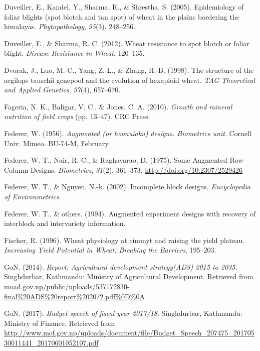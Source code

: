 \documentclass[12pt,oneside]{dukestatscithesis} %
\newlength{\cslhangindent}
\newenvironment{cslreferences}%
  {\setlength{\parindent}{0pt}%
  \everypar{\setlength{\hangindent}{\cslhangindent}}\ignorespaces}%
  {\par}
\begin{document}
\begin{cslreferences}
\leavevmode\hypertarget{ref-duveiller2005epidemiology}{}%
Duveiller, E., Kandel, Y., Sharma, R., \& Shrestha, S. (2005). Epidemiology of foliar blights (spot blotch and tan spot) of wheat in the plains bordering the himalayas. \emph{Phytopathology}, \emph{95}(3), 248--256.

\leavevmode\hypertarget{ref-duveiller2012wheat}{}%
Duveiller, E., \& Sharma, R. C. (2012). Wheat resistance to spot blotch or foliar blight. \emph{Disease Resistance in Wheat}, 120--135.

\leavevmode\hypertarget{ref-dvorak1998structure}{}%
Dvorak, J., Luo, M.-C., Yang, Z.-L., \& Zhang, H.-B. (1998). The structure of the aegilops tauschii genepool and the evolution of hexaploid wheat. \emph{TAG Theoretical and Applied Genetics}, \emph{97}(4), 657--670.

\leavevmode\hypertarget{ref-fageria2010growth}{}%
Fageria, N. K., Baligar, V. C., \& Jones, C. A. (2010). \emph{Growth and mineral nutrition of field crops} (pp. 13--47). CRC Press.

\leavevmode\hypertarget{ref-federer1956augmented}{}%
Federer, W. (1956). \emph{Augmented (or hoonuiaku) designs. Biometrics unit}. Cornell Univ. Mimeo. BU-74-M, February.

\leavevmode\hypertarget{ref-federer_augmented_1975}{}%
Federer, W. T., Nair, R. C., \& Raghavarao, D. (1975). Some Augmented Row-Column Designs. \emph{Biometrics}, \emph{31}(2), 361--373. \url{http://doi.org/10.2307/2529426}

\leavevmode\hypertarget{ref-federer_incomplete_2002}{}%
Federer, W. T., \& Nguyen, N.-k. (2002). Incomplete block designs. \emph{Encyclopedia of Environmetrics}.

\leavevmode\hypertarget{ref-federer_augmented_1994}{}%
Federer, W. T., \& others. (1994). Augmented experiment designs with recovery of interblock and intervariety information.

\leavevmode\hypertarget{ref-fischer1996wheat}{}%
Fischer, R. (1996). Wheat physiology at cimmyt and raising the yield plateau. \emph{Increasing Yield Potential in Wheat: Breaking the Barriers}, 195--203.

\leavevmode\hypertarget{ref-ads2072_report}{}%
GoN. (2014). \emph{Report: Agricultural development strategy(ADS) 2015 to 2035}. Singhdurbar, Kathmandu: Ministry of Agricultural Development. Retrieved from \url{moad.gov.np/public/uploads/537172830-final\%20ADS\%20report\%202072.pdf\%0D\%0A}

\leavevmode\hypertarget{ref-fiscal_budget201718}{}%
GoN. (2017). \emph{Budget speech of fiscal year 2017/18}. Singhdurbar, Kathmandu: Ministry of Finance. Retrieved from \url{http://www.mof.gov.np/uploads/document/file/Budget_Speech_207475_20170530011441_20170601052107.pdf}


\end{cslreferences}
\end{document}
